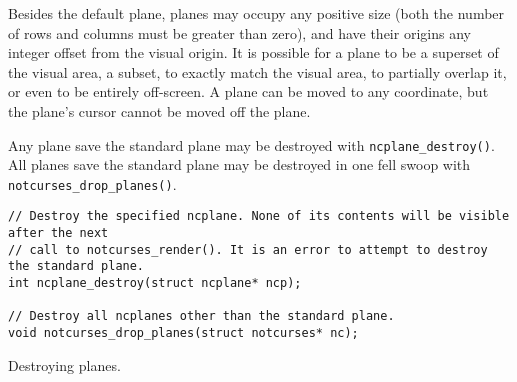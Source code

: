 Besides the default plane, planes may occupy any positive size (both the number
of rows and columns must be greater than zero), and have their origins any
integer offset from the visual origin. It is possible for a plane to be a
superset of the visual area, a subset, to exactly match the visual area, to
partially overlap it, or even to be entirely off-screen. A plane can be
moved to any coordinate, but the plane's cursor cannot be moved off the plane.

Any plane save the standard plane may be destroyed with \texttt{ncplane\_destroy()}.
All planes save the standard plane may be destroyed in one fell swoop with
\texttt{notcurses\_drop\_planes()}.
\begin{listing}[!htb]
\begin{verbatim}
// Destroy the specified ncplane. None of its contents will be visible after the next
// call to notcurses_render(). It is an error to attempt to destroy the standard plane.
int ncplane_destroy(struct ncplane* ncp);

// Destroy all ncplanes other than the standard plane.
void notcurses_drop_planes(struct notcurses* nc);
\end{verbatim}
\caption{Destroying planes.}
\end{listing}

